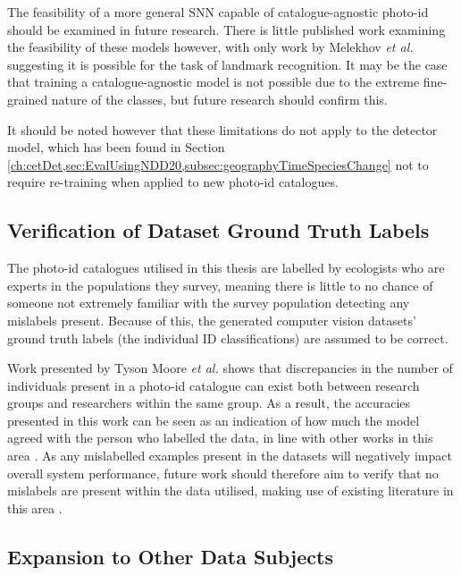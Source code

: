 The feasibility of a more general SNN capable of catalogue-agnostic photo-id should be examined in future research. There is little published work examining the feasibility of these models however, with only work by Melekhov \textit{et al.} \cite{melekhov_siamese_2016} suggesting it is possible for the task of landmark recognition. It may be the case that training a catalogue-agnostic model is not possible due to the extreme fine-grained nature of the classes, but future research should confirm this. 

It should be noted however that these limitations do not apply to the detector model, which has been found in Section \ref{ch:cetDet,sec:EvalUsingNDD20,subsec:geographyTimeSpeciesChange} not to require re-training when applied to new photo-id catalogues.

\subsection{Verification of Dataset Ground Truth Labels}\label{ch:Conclusion,sec:FutureWork,sub:verifyGroundTruths}

The photo-id catalogues utilised in this thesis are labelled by ecologists who are experts in the populations they survey, meaning there is little to no chance of someone not extremely familiar with the survey population detecting any mislabels present. Because of this, the generated computer vision datasets' ground truth labels (the individual ID classifications) are assumed to be correct. 

Work presented by Tyson Moore \textit{et al.} \cite{tyson_moore_rise_2022} shows that discrepancies in the number of individuals present in a photo-id catalogue can exist both between research groups and researchers within the same group. As a result, the accuracies presented in this work can be seen as an indication of how much the model agreed with the person who labelled the data, in line with other works in this area \cite{boulent_scaling_2023}. As any mislabelled examples present in the datasets will negatively impact overall system performance, future work should therefore aim to verify that no mislabels are present within the data utilised, making use of existing literature in this area \cite{muller_identifying_2019, ekambaram_finding_2017}.


\subsection{Expansion to Other Data Subjects}\label{ch:Conclusion,sec:FutureWork,sub:Underwater,Video,OtherCetaceans}

